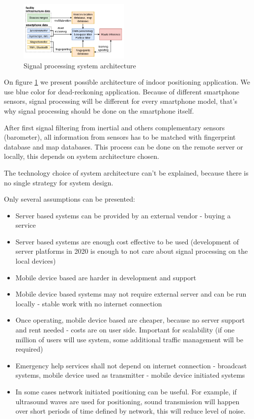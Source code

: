 \begin{figure}[h]
    \centering
    \includegraphics[width=0.48\textwidth]{img/indoor navigation roadmap-Page-3.png}
    \caption{Signal processing system architecture}
    \label{fig:arch}
\end{figure}

On figure \ref{fig:arch} we present possible architecture of indoor positioning application.
We use blue color for dead-reckoning application. Because of different smartphone sensors, signal processing will be different for every smartphone model, that's why signal processing should be done on the smartphone itself.

After first signal filtering from inertial and others complementary sensors (barometer), all information from sensors has to be matched with fingerprint database and map databases. This process can be done on the remote server or locally, this depends on system architecture chosen.

The technology choice of system architecture can't be explained, because there is no single strategy for system design.

Only several assumptions can be presented:

\begin{itemize}[noitemsep]
\item Server based systems can be provided by an external vendor - buying a service
\item Server based systems are enough cost effective to be used (development of server platforms in 2020 is enough to not care about signal processing on the local devices)
\item Mobile device based are harder in development and support
\item Mobile device based systems may not require external server and can be run locally - stable work with no internet connection
\item Once operating, mobile device based are cheaper, because no server support and rent needed - costs are on user side. Important for scalability (if one million of users will use system, some additional traffic management will be required)
\item Emergency help services shall not depend on internet connection - broadcast systems, mobile device used as transmitter - mobile device initiated systems
\item In some cases network initiated positioning can be useful. For example, if ultrasound waves are used for positioning, sound transmission will happen over short periods of time defined by network, this will reduce level of noise.
\end{itemize}

